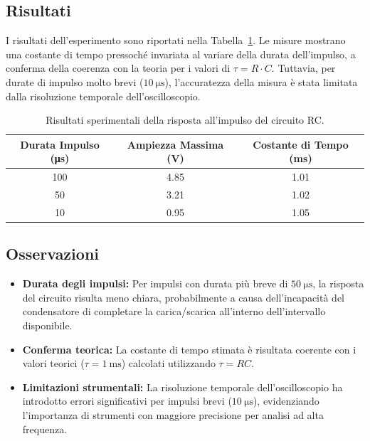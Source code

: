 \documentclass[a4paper,12pt]{article}
\begin{document}
\subsection{Risultati}
I risultati dell’esperimento sono riportati nella Tabella~\ref{tab:rc_impulse_response}. Le misure mostrano una costante di tempo pressoché invariata al variare della durata dell’impulso, a conferma della coerenza con la teoria per i valori di \(\tau = R \cdot C\). Tuttavia, per durate di impulso molto brevi (\(\SI{10}{\micro\second}\)), l’accuratezza della misura è stata limitata dalla risoluzione temporale dell'oscilloscopio.

\begin{table}[H]
\centering
\begin{tabular}{|c|c|c|}
\hline
\textbf{Durata Impulso (\si{\micro\second})} & \textbf{Ampiezza Massima (\si{\volt})} & \textbf{Costante di Tempo (\si{\milli\second})} \\ \hline
100 & 4.85 & 1.01 \\ \hline
50 & 3.21 & 1.02 \\ \hline
10 & 0.95 & 1.05 \\ \hline
\end{tabular}
\caption{Risultati sperimentali della risposta all’impulso del circuito RC.}
\label{tab:rc_impulse_response}
\end{table}

\subsection{Osservazioni}
\begin{itemize}
    \item \textbf{Durata degli impulsi:} Per impulsi con durata più breve di \(\SI{50}{\micro\second}\), la risposta del circuito risulta meno chiara, probabilmente a causa dell’incapacità del condensatore di completare la carica/scarica all'interno dell'intervallo disponibile.
    \item \textbf{Conferma teorica:} La costante di tempo stimata è risultata coerente con i valori teorici (\(\tau = \SI{1}{\milli\second}\)) calcolati utilizzando \(\tau = RC\).
    \item \textbf{Limitazioni strumentali:} La risoluzione temporale dell’oscilloscopio ha introdotto errori significativi per impulsi brevi (\(\SI{10}{\micro\second}\)), evidenziando l’importanza di strumenti con maggiore precisione per analisi ad alta frequenza.
\end{itemize}
\end{document}

